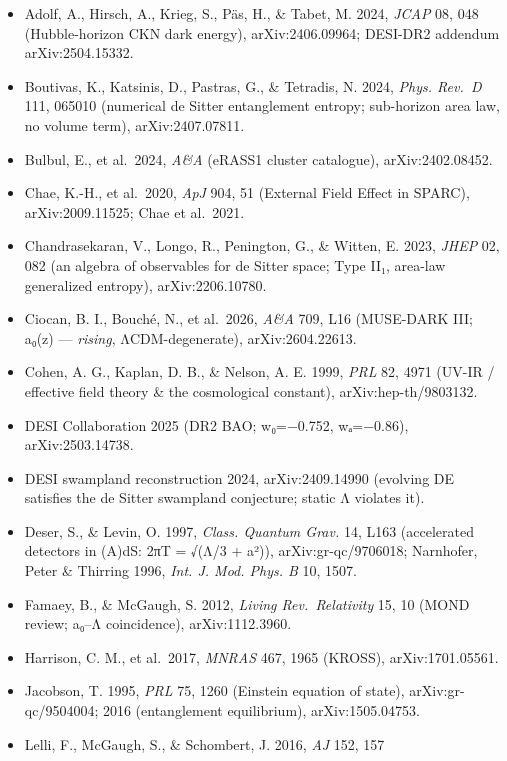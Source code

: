 \documentclass[
]{article}
\providecommand{\tightlist}{%
  \setlength{\itemsep}{0pt}\setlength{\parskip}{0pt}}
\begin{document}
\begin{itemize}
\tightlist
\item
  Adolf, A., Hirsch, A., Krieg, S., Päs, H., \& Tabet, M. 2024,
  \emph{JCAP} 08, 048 (Hubble-horizon CKN dark energy),
  arXiv:2406.09964; DESI-DR2 addendum arXiv:2504.15332.
\item
  Boutivas, K., Katsinis, D., Pastras, G., \& Tetradis, N. 2024,
  \emph{Phys. Rev.~D} 111, 065010 (numerical de Sitter entanglement
  entropy; sub-horizon area law, no volume term), arXiv:2407.07811.
\item
  Bulbul, E., et al.~2024, \emph{A\&A} (eRASS1 cluster catalogue),
  arXiv:2402.08452.
\item
  Chae, K.-H., et al.~2020, \emph{ApJ} 904, 51 (External Field Effect in
  SPARC), arXiv:2009.11525; Chae et al.~2021.
\item
  Chandrasekaran, V., Longo, R., Penington, G., \& Witten, E. 2023,
  \emph{JHEP} 02, 082 (an algebra of observables for de Sitter space;
  Type II₁, area-law generalized entropy), arXiv:2206.10780.
\item
  Ciocan, B. I., Bouché, N., et al.~2026, \emph{A\&A} 709, L16
  (MUSE-DARK III; a₀(z) --- \emph{rising}, ΛCDM-degenerate),
  arXiv:2604.22613.
\item
  Cohen, A. G., Kaplan, D. B., \& Nelson, A. E. 1999, \emph{PRL} 82,
  4971 (UV-IR / effective field theory \& the cosmological constant),
  arXiv:hep-th/9803132.
\item
  DESI Collaboration 2025 (DR2 BAO; w₀=−0.752, wₐ=−0.86),
  arXiv:2503.14738.
\item
  DESI swampland reconstruction 2024, arXiv:2409.14990 (evolving DE
  satisfies the de Sitter swampland conjecture; static Λ violates it).
\item
  Deser, S., \& Levin, O. 1997, \emph{Class. Quantum Grav.} 14, L163
  (accelerated detectors in (A)dS: 2πT = √(Λ/3 + a²)),
  arXiv:gr-qc/9706018; Narnhofer, Peter \& Thirring 1996, \emph{Int. J.
  Mod. Phys. B} 10, 1507.
\item
  Famaey, B., \& McGaugh, S. 2012, \emph{Living Rev.~Relativity} 15, 10
  (MOND review; a₀--Λ coincidence), arXiv:1112.3960.
\item
  Harrison, C. M., et al.~2017, \emph{MNRAS} 467, 1965 (KROSS),
  arXiv:1701.05561.
\item
  Jacobson, T. 1995, \emph{PRL} 75, 1260 (Einstein equation of state),
  arXiv:gr-qc/9504004; 2016 (entanglement equilibrium),
  arXiv:1505.04753.
\item
  Lelli, F., McGaugh, S., \& Schombert, J. 2016, \emph{AJ} 152, 157

\end{itemize}
\end{document}
